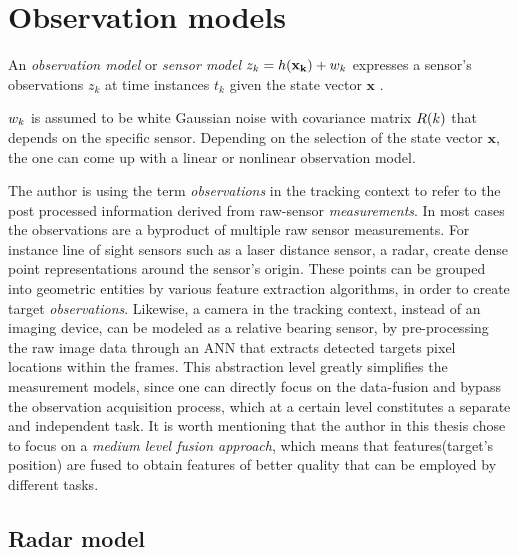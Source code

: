 
\section{Observation models}

An \emph{observation model} or \emph{sensor model} $z_k = h(\mathbf{x_k}) + {w}_k$ expresses a sensor's observations $z_k$ at time instances $t_k$ given the state vector $\mathbf{x}$ .

 ${w}_k$ is assumed to be white Gaussian noise with covariance matrix ${R}(k)$ that depends on the specific sensor. Depending on the selection of the state vector $\mathbf{x}$, the one can come up with a linear or nonlinear observation model.

The author is using the term \emph{observations} in the tracking context to refer to the post processed information derived from raw-sensor \emph{measurements}. In most cases the observations are a byproduct of multiple raw sensor measurements. For instance line of sight sensors such as a laser distance sensor, a radar, create dense point representations around the sensor's origin. These points can be grouped into geometric entities by various feature extraction algorithms, in order to create target \emph{observations}.  Likewise, a camera in the tracking context, instead of an imaging device, can be modeled as a relative bearing sensor, by pre-processing the raw image data through an ANN that extracts detected targets pixel locations within the frames. This abstraction level greatly simplifies the measurement models, since one can directly focus on the data-fusion and bypass the observation acquisition process, which at a certain level constitutes a separate and independent task. It is worth mentioning that the author in this thesis chose to focus on a \emph{medium level fusion approach}\cite{Luo2002}, which means that features(target's position) are fused to obtain features of better quality that can be employed by different tasks.





\subsection{Radar model}

